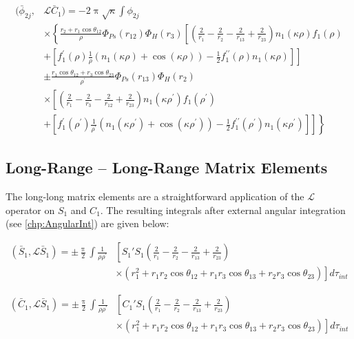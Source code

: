 \documentclass[Dissertation.tex]{subfiles}
\begin{document}
\begin{align}
\label{eq:PWavePhi2CBar}
\nonumber (\bar{\phi}_{2j},&\mathcal{L} \bar{C}_1) = -2 \uppi \sqrt{\kappa} \int \phi_{2j} \\
&\times \left\{ \frac{r_2 + r_1 \cos\theta_{12}}{\rho} \Phi_{Ps}(r_{12}) \Phi_H(r_3) \left[ \left( \frac{2}{r_1} - \frac{2}{r_2} - \frac{2}{r_{13}} + \frac{2}{r_{23}} \right) n_1(\kappa\rho) f_1(\rho) \right. \right. \\
\nonumber & + \left.\left. \left[f_1^\prime(\rho) \frac{1}{\rho} \left( n_1(\kappa\rho) + \cos(\kappa\rho) \right) - \frac{1}{2} f_1^{\prime\prime}(\rho) n_1(\kappa\rho) \right]\right] \right. \\
\nonumber & \pm \frac{r_1 \cos\theta_{12} + r_3 \cos\theta_{23}}{\rho^\prime}  \Phi_{Ps}(r_{13}) \Phi_H(r_2) \\
& \times \left. \left[ \left( \frac{2}{r_1} - \frac{2}{r_3} - \frac{2}{r_{12}} + \frac{2}{r_{23}} \right) n_1(\kappa\rho^\prime) f_1(\rho^\prime) \right.\right. \\
\nonumber & + \left.\left. \left[f_1^\prime(\rho^\prime) \frac{1}{\rho^\prime} \left( n_1(\kappa\rho^\prime) + \cos(\kappa\rho^\prime) \right) - \frac{1}{2} f_1^{\prime\prime}(\rho^\prime) n_1(\kappa\rho^\prime) \right]\right]\right\}
\end{align}


\subsection{Long-Range -- Long-Range Matrix Elements}
\label{sec:PWaveLongLong}

The long-long matrix elements are a straightforward application of the
$\mathcal{L}$ operator on $S_1$ and $C_1$. The resulting integrals after
external angular integration (see \cref{chp:AngularInt}) are given below: 

\begin{align}
\label{eq:PWaveSBarSBar}
\left(\bar{S}_1,\mathcal{L}\bar{S}_1\right) = \pm \frac{\uppi}{2} \int \frac{1}{\rho\rho^\prime} & \left[S_1' S_1 \left(\frac{2}{r_1} - \frac{2}{r_2} - \frac{2}{r_{13}} + \frac{2}{r_{23}} \right) \right.  \nonumber \\
& \left. \times \left(r_1^2 + r_1 r_2 \cos\theta_{12} + r_1 r_3 \cos\theta_{13} + r_2 r_3 \cos\theta_{23} \right) \right] d\tau_{int}
\end{align}

\begin{align}
\label{eq:PWaveCBarSBar}
\left(\bar{C}_1,\mathcal{L}\bar{S}_1\right) = \pm \frac{\uppi}{2} \int \frac{1}{\rho\rho^\prime} & \left[C_1' S_1 \left(\frac{2}{r_1} - \frac{2}{r_2} - \frac{2}{r_{13}} + \frac{2}{r_{23}} \right) \right.  \nonumber \\
& \left. \times \left(r_1^2 + r_1 r_2 \cos\theta_{12} + r_1 r_3 \cos\theta_{13} + r_2 r_3 \cos\theta_{23} \right) \right] d\tau_{int}
\end{align}
\end{document}
